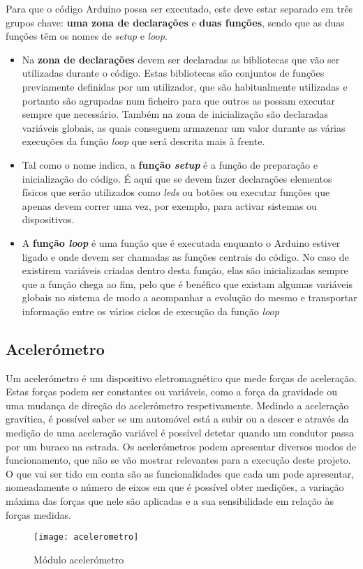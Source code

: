 Para que o código Arduino possa ser executado, este deve estar separado em três grupos chave: \textbf{uma zona de declarações} e \textbf{duas funções}, sendo que as duas funções têm os nomes de \emph{setup} e \emph{loop}.
\begin{itemize}
\item Na \textbf{zona de declarações} devem ser declaradas as bibliotecas que vão ser utilizadas durante o código. Estas bibliotecas são conjuntos de funções previamente definidas por um utilizador, que são habitualmente  utilizadas e portanto são agrupadas num ficheiro para que outros as possam executar sempre que necessário. Também na zona de inicialização são declaradas variáveis globais, as quais conseguem armazenar um valor durante as várias execuções da função \emph{loop} que será descrita mais à frente.

\item Tal como o nome indica, a \textbf{função \emph{setup}} é a função de preparação e inicialização do código. É aqui que se devem fazer declarações elementos físicos que serão utilizados como \emph{leds} ou botões ou executar funções que apenas devem correr uma vez, por exemplo, para activar sistemas ou dispositivos.

\item A \textbf{função \emph{loop}} é uma função que é executada enquanto o Arduino estiver ligado e onde devem ser chamadas as funções centrais do código. No caso de existirem variáveis criadas dentro desta função, elas são inicializadas sempre que a função chega ao fim, pelo que é benéfico que existam algumas variáveis globais no sistema de modo a acompanhar a evolução do mesmo e transportar informação entre os vários ciclos de execução da função \emph{loop}
\end{itemize}

\subsection{Acelerómetro}
\label{subsec:acelerometro}
Um acelerómetro é um dispositivo eletromagnético que mede forças de aceleração. Estas forças podem ser constantes ou variáveis, como a força da gravidade ou uma mudança de direção do acelerómetro respetivamente. Medindo a aceleração gravítica, é possível saber se um automóvel está a subir ou a descer e através da medição de uma aceleração variável é possível detetar quando um condutor passa por um buraco na estrada. Os acelerómetros podem apresentar diversos modos de funcionamento, que não se vão mostrar relevantes para a execução deste projeto. O que vai ser tido em conta são as funcionalidades que cada um pode apresentar, nomeadamente o número de eixos em que é possível obter medições, a variação máxima das forças que nele são aplicadas e a sua sensibilidade em relação às forças medidas.
\begin{figure}[hbtp]
	\centering
	\texttt{[image: acelerometro]}
	\caption{Módulo acelerómetro}
	\label{fig:modulo_acelerometro}
\end{figure}	

